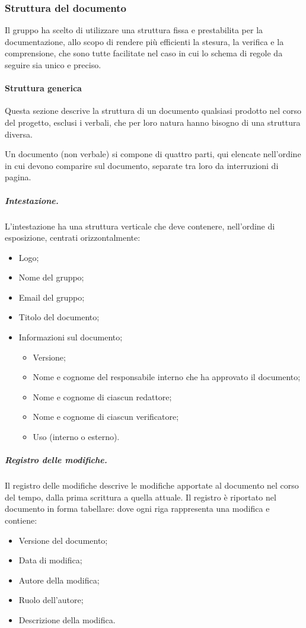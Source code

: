 \subsubsection{Struttura del documento}
Il gruppo ha scelto di utilizzare una struttura fissa e prestabilita per la documentazione, allo scopo di rendere più efficienti la stesura, la verifica e la comprensione, che sono tutte facilitate nel caso in cui lo schema di regole da seguire sia unico e preciso.
\paragraph{Struttura generica}
Questa sezione descrive la struttura di un documento qualsiasi prodotto nel corso del progetto, esclusi i verbali, che per loro natura hanno bisogno di una struttura diversa.
\par Un documento (non verbale) si compone di quattro parti, qui elencate nell'ordine in cui devono comparire sul documento, separate tra loro da interruzioni di pagina.
\subparagraph{Intestazione.}
L'intestazione ha una struttura verticale che deve contenere, nell'ordine di esposizione, centrati orizzontalmente:
\begin{itemize}
    \item Logo;
    \item Nome del gruppo;
    \item Email del gruppo;
    \item Titolo del documento;
    \item Informazioni sul documento;
    \begin{itemize}
        \item Versione;
        \item Nome e cognome del responsabile interno che ha approvato il documento;
        \item Nome e cognome di ciascun redattore;
        \item Nome e cognome di ciascun verificatore;
        \item Uso (interno o esterno).
    \end{itemize}
\end{itemize}
\subparagraph{Registro delle modifiche.}
Il registro delle modifiche descrive le modifiche apportate al documento nel corso del tempo, dalla prima scrittura a quella attuale. Il registro è riportato nel documento in forma tabellare: dove ogni riga rappresenta una modifica e contiene:
\begin{itemize}
    \item Versione del documento;
    \item Data di modifica;
    \item Autore della modifica;
    \item Ruolo dell'autore;
    \item Descrizione della modifica.
\end{itemize}
